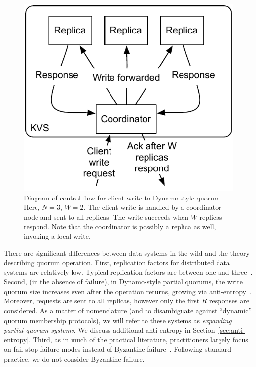 \documentclass{vldb}
\begin{document}
\begin{figure}
\centering
\includegraphics[width=.8\columnwidth]{figs/dynamo-quorum.pdf}
\vspace{-8pt}
\caption{Diagram of control flow for client write to Dynamo-style
  quorum.  Here, $N=3$, $W=2$. The client write is handled by a
  coordinator node and sent to all replicas. The write succeeds when
  $W$ replicas respond.  Note that the coordinator is possibly a
  replica as well, invoking a local write.}
\vspace{-12pt}
\label{fig:dynamo-quorum}
\end{figure}

There are significant differences between data systems in the wild and
the theory describing quorum operation.  First, replication factors
for distributed data systems are relatively low.  Typical replication
factors are between one and three~\cite{cassandradefault, feinbergpc,
  codapc}.  Second, (in the absence of failure), in Dynamo-style
partial quorums, the write quorum size increases even after the
operation returns, growing via anti-entropy~\cite{antientropy}.
Moreover, requests are sent to all replicas, however only the first
$R$ responses are considered.  As a matter of nomenclature (and to
disambiguate against ``dynamic'' quorum membership protocols), we will
refer to these systems as \textit{expanding partial quorum
  systems}. We discuss additional anti-entropy in
Section~\ref{sec:anti-entropy}. Third, as in much of the practical
literature, practitioners largely focus on fail-stop failure modes
instead of Byzantine failure~\cite{birman-byzantine}.  Following
standard practice, we do not consider Byzantine failure.
\end{document}
